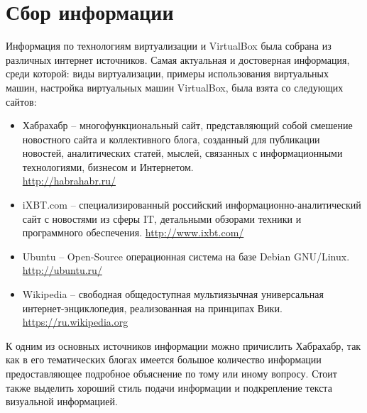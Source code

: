 \documentclass[a4paper, 14pt]{extreport}
\begin{document}
    \chapter{Сбор информации}
    Информация по технологиям виртуализации и VirtualBox была собрана из
    различных интернет источников. Самая актуальная и достоверная информация,
    среди которой: виды виртуализации, примеры использования виртуальных машин,
    настройка виртуальных машин VirtualBox, была взята со следующих сайтов:
    \begin{itemize}
        \item Хабрахабр -- многофункциональный сайт, представляющий собой
            смешение новостного сайта и коллективного блога, созданный для
            публикации новостей, аналитических статей, мыслей, связанных с
            информационными технологиями, бизнесом и Интернетом.\\
            \url{http://habrahabr.ru/}
        \item iXBT.com -- специализированный российский
            информационно-аналитический сайт с новостями из сферы IT,
            детальными обзорами техники и программного обеспечения.
            \url{http://www.ixbt.com/}
        \item Ubuntu -- Open-Source операционная система на базе Debian
            GNU/Linux.\\
            \url{http://ubuntu.ru/}
        \item Wikipedia -- свободная общедоступная мультиязычная
            универсальная ин\-тер\-нет-энциклопедия, реализованная на принципах
            Вики.\\
            \url{https://ru.wikipedia.org}
    \end{itemize}
    
    К одним из основных источников информации можно причислить Хабрахабр, так
    как в его тематических блогах имеется большое количество информации
    предоставляющее подробное объяснение по тому или иному вопросу. Стоит также
    выделить хороший стиль подачи информации и подкрепление текста визуальной
    информацией.
\end{document}
